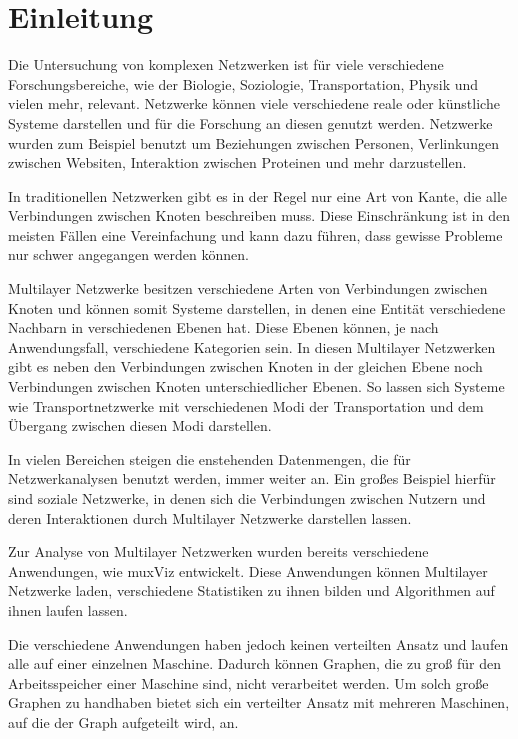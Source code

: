\chapter{Einleitung}


Die Untersuchung von komplexen Netzwerken ist für viele verschiedene Forschungsbereiche, wie der Biologie, Soziologie, Transportation, Physik und vielen mehr, relevant. 
Netzwerke können viele verschiedene reale oder künstliche Systeme darstellen und für die Forschung an diesen genutzt werden. Netzwerke wurden zum Beispiel benutzt um Beziehungen zwischen Personen, Verlinkungen zwischen Websiten, Interaktion zwischen Proteinen und mehr darzustellen.

In traditionellen Netzwerken gibt es in der Regel nur eine Art von Kante, die alle Verbindungen zwischen Knoten beschreiben muss.
Diese Einschränkung ist in den meisten Fällen eine Vereinfachung und kann dazu führen, dass gewisse Probleme nur schwer angegangen werden können. 

Multilayer Netzwerke besitzen verschiedene Arten von Verbindungen zwischen Knoten und können somit Systeme darstellen, in denen eine Entität verschiedene Nachbarn in verschiedenen Ebenen hat.
Diese Ebenen können, je nach Anwendungsfall, verschiedene Kategorien sein. In diesen Multilayer Netzwerken gibt es neben den Verbindungen zwischen Knoten in der gleichen Ebene noch Verbindungen zwischen Knoten unterschiedlicher Ebenen.
So lassen sich Systeme wie Transportnetzwerke mit verschiedenen Modi der Transportation und dem Übergang zwischen diesen Modi darstellen.

In vielen Bereichen steigen die enstehenden Datenmengen, die für Netzwerkanalysen benutzt werden, immer weiter an. Ein großes Beispiel hierfür sind soziale Netzwerke, in denen sich die Verbindungen zwischen Nutzern und deren Interaktionen durch Multilayer Netzwerke darstellen lassen.


Zur Analyse von Multilayer Netzwerken wurden bereits verschiedene Anwendungen, wie muxViz entwickelt. Diese Anwendungen können Multilayer Netzwerke laden, verschiedene Statistiken zu ihnen bilden und Algorithmen auf ihnen laufen lassen.

Die verschiedene Anwendungen haben jedoch keinen verteilten Ansatz und laufen alle auf einer einzelnen Maschine. Dadurch können Graphen, die zu groß für den Arbeitsspeicher einer Maschine sind, nicht verarbeitet werden. 
Um solch große Graphen zu handhaben bietet sich ein verteilter Ansatz mit mehreren Maschinen, auf die der Graph aufgeteilt wird, an.


